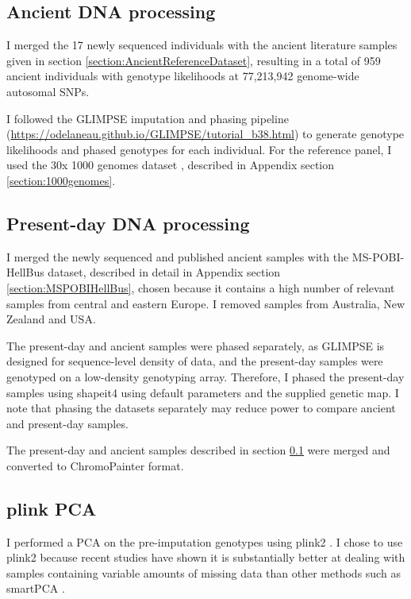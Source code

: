 \subsection{Ancient DNA processing} \label{AncientDNAprocessing}

I merged the 17 newly sequenced individuals with the ancient literature samples given in section \ref{section:AncientReferenceDataset}, resulting in a total of 959 ancient individuals with genotype likelihoods at 77,213,942 genome-wide autosomal SNPs. 

I followed the GLIMPSE \cite{rubinacci2021efficient} imputation and phasing pipeline (\url{https://odelaneau.github.io/GLIMPSE/tutorial_b38.html}) to generate genotype likelihoods and phased genotypes for each individual. For the reference panel, I used the 30x 1000 genomes dataset \cite{byrska2021high}, described in Appendix section \ref{section:1000genomes}.  

\subsection{Present-day DNA processing} \label{PresentdayDNAprocessing}

I  merged the newly sequenced and published ancient samples with the MS-POBI-HellBus dataset, described in detail in Appendix section \ref{section:MSPOBIHellBus}, chosen because it contains a high number of relevant samples from central and eastern Europe. I removed samples from Australia, New Zealand and USA.

The present-day and ancient samples were phased separately, as GLIMPSE is designed for sequence-level density of data, and the present-day samples were genotyped on a low-density genotyping array. Therefore, I phased the present-day samples using shapeit4 \cite{delaneau2018integrative} using default parameters and the supplied genetic map. I note that phasing the datasets separately may reduce power to compare ancient and present-day samples. 

The present-day and ancient samples described in section \ref{AncientDNAprocessing} were merged and converted to ChromoPainter format.

\subsection{plink PCA}

I performed a PCA on the pre-imputation genotypes using plink2 \cite{chang2015second}. I chose to use plink2 because recent studies have shown it is substantially better at dealing with samples containing variable amounts of missing data than other methods such as smartPCA \cite{AlbrechtsenPCAmissingness}.

